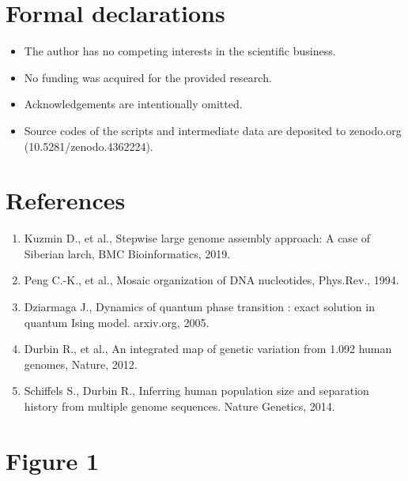 \documentclass[a4paper]{article}
\begin{document}
\section{Formal declarations}

\begin{itemize}

\item The author has no competing interests in the scientific business.

\item No funding was acquired for the provided research. 

\item Acknowledgements are intentionally omitted.

\item Source codes of the scripts and intermediate data are deposited to zenodo.org (10.5281/zenodo.4362224).

\end{itemize}

\section{References}

\begin{enumerate}

\item Kuzmin D., et al., Stepwise large genome assembly approach: A case of Siberian larch, BMC Bioinformatics, 2019.

\item Peng C.-K., et al., Mosaic organization of DNA nucleotides, Phys.Rev., 1994.

\item Dziarmaga J., Dynamics of quantum phase transition : exact solution in quantum Ising model. arxiv.org, 2005.

\item Durbin R., et al., An integrated map of genetic variation from 1.092 human genomes, Nature, 2012.

\item Schiffels S., Durbin R., Inferring human population size and separation history from multiple genome sequences. Nature Genetics, 2014.

\end{enumerate}

\newpage

\section*{Figure 1}
\end{document}
